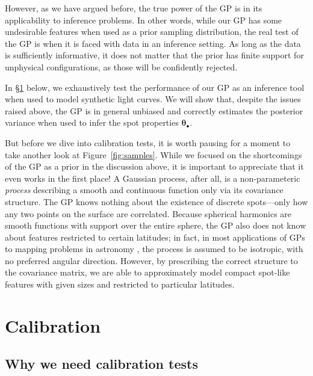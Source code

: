 \documentclass[modern,linenumbers]{aastex62}
\begin{document}
However, as we have argued before, the true power of the GP is in its
applicability to inference problems. In other words, while our GP has some
undesirable features when used as a prior sampling distribution, the real test
of the GP is when it is faced with data in an inference setting.
As long as the data is sufficiently informative, it does not matter that the
prior has finite support for unphysical configurations, as those
will be confidently rejected.

In \S\ref{sec:calibration} below, we exhaustively test the performance of our
GP as an inference tool when used to model synthetic light curves. We will
show that, despite the issues raised above, the GP is in general unbiased and
correctly estimates the posterior variance when used to infer the spot
properties $\pmb{\theta}_\bullet$.

But before we dive into calibration tests, it is worth pausing for a moment to take another
look at Figure~\ref{fig:samples}. While we focused on the shortcomings of
the GP as a prior in the discussion above, it is important to appreciate
that it even works in the first place!
A Gaussian process, after all, is a non-parameteric
\emph{process} describing a smooth and continuous function only via its
covariance structure. The GP knows nothing about the existence of discrete
spots---only how any two points on the surface are correlated.
Because spherical harmonics are smooth functions with support over the
entire sphere, the GP also does not know about features restricted
to certain latitudes; in fact, in most applications of GPs to mapping
problems in astronomy \citep[such as in models of the cosmic microwave
    background; e.g.,][]{Wandelt2012}, the process is assumed to be isotropic,
with no preferred angular direction.
However, by prescribing the correct structure to the covariance matrix,
we are able to approximately model compact spot-like
features with given sizes and restricted to particular latitudes.

\section{Calibration}
\label{sec:calibration}

\subsection{Why we need calibration tests}
\label{sec:why-calibrate}
\end{document}
